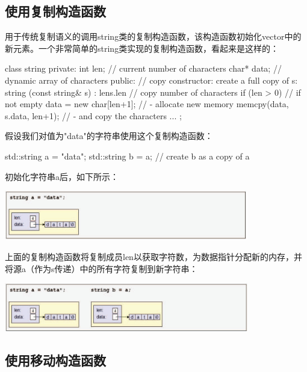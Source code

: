 \subsection{使用复制构造函数}

用于传统复制语义的调用string类的复制构造函数，该构造函数初始化vector中的新元素。一个非常简单的string类实现的复制构造函数，看起来是这样的：

\begin{cppcode}
class string {
	private:
	int len; // current number of characters
	char* data; // dynamic array of characters
	public:
	// copy constructor: create a full copy of s:
	string (const string& s)
	: len{s.len} { // copy number of characters
		if (len > 0) { // if not empty
			data = new char[len+1]; // - allocate new memory
			memcpy(data, s.data, len+1); // - and copy the characters
		}
	}
	...
};
\end{cppcode}

假设我们对值为"data"的字符串使用这个复制构造函数：

\begin{cppcode}
std::string a = "data";
std::string b = a; // create b as a copy of a
\end{cppcode}

初始化字符串a后，如下所示：

\begin{center}
	\includegraphics[width=0.8\textwidth]{part1/ch1/images/18}
\end{center}

上面的复制构造函数将复制成员len以获取字符数，为数据指针分配新的内存，并将源a（作为s传递）中的所有字符复制到新字符串：

\begin{center}
	\includegraphics[width=0.8\textwidth]{part1/ch1/images/19}
\end{center}

\subsection{使用移动构造函数}

